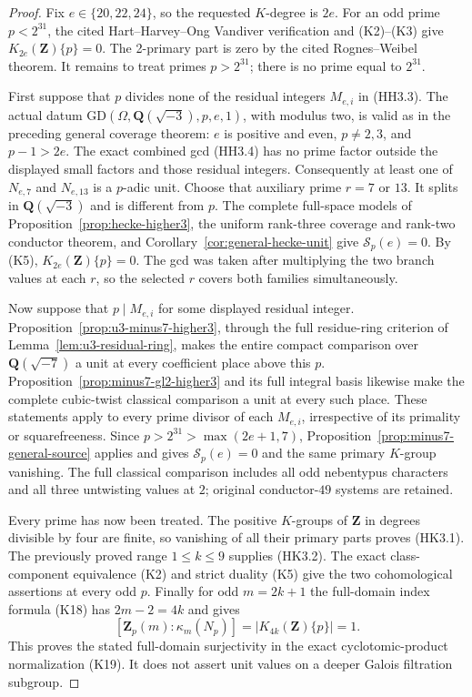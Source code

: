 \begin{proof}
Fix $e\in\{20,22,24\}$, so the requested $K$-degree is $2e$.
For an odd prime $p<2^{31}$, the cited Hart--Harvey--Ong
Vandiver verification and (K2)--(K3) give
$K_{2e}(\mathbf Z)\{p\}=0$. The 2-primary part is zero by
the cited Rognes--Weibel theorem. It remains to treat
primes $p>2^{31}$; there is no prime equal to $2^{31}$.

First suppose that $p$ divides none of the residual integers
$M_{e,i}$ in (HH3.3). The actual datum
$\mathrm{GD}(\Omega,\mathbf Q(\sqrt{-3}),p,e,1)$, with
modulus two, is valid as in the preceding general coverage
theorem: $e$ is positive and even, $p\ne2,3$, and $p-1>2e$.
The exact combined gcd (HH3.4) has no prime factor outside
the displayed small factors and those residual integers.
Consequently at least one of $N_{e,7}$ and $N_{e,13}$ is a
$p$-adic unit. Choose that auxiliary prime $r=7$ or $13$.
It splits in $\mathbf Q(\sqrt{-3})$ and is different from $p$.
The complete full-space models of
Proposition~\ref{prop:hecke-higher3}, the uniform rank-three
coverage and rank-two conductor theorem, and
Corollary~\ref{cor:general-hecke-unit} give
$\mathcal S_p(e)=0$. By (K5),
$K_{2e}(\mathbf Z)\{p\}=0$.
The gcd was taken after multiplying the two branch values
at each $r$, so the selected $r$ covers both families
simultaneously.

Now suppose that $p\mid M_{e,i}$ for some displayed residual
integer. Proposition~\ref{prop:u3-minus7-higher3}, through the
full residue-ring criterion of Lemma~\ref{lem:u3-residual-ring},
makes the entire compact comparison over
$\mathbf Q(\sqrt{-7})$ a unit at every coefficient place
above this $p$. Proposition~\ref{prop:minus7-gl2-higher3}
and its full integral basis likewise make the complete
cubic-twist classical comparison a unit at every such place.
These statements apply to every prime divisor of each
$M_{e,i}$, irrespective of its primality or squarefreeness.
Since $p>2^{31}>\max(2e+1,7)$,
Proposition~\ref{prop:minus7-general-source} applies and gives
$\mathcal S_p(e)=0$ and the same primary $K$-group vanishing.
The full classical comparison includes all odd nebentypus
characters and all three untwisting values at $2$; original
conductor-$49$ systems are retained.

Every prime has now been treated. The positive $K$-groups of
$\mathbf Z$ in degrees divisible by four are finite, so
vanishing of all their primary parts proves (HK3.1).
The previously proved range $1\leq k\leq9$ supplies (HK3.2).
The exact class-component equivalence (K2) and strict duality
(K5) give the two cohomological assertions at every odd $p$.
Finally for odd $m=2k+1$ the full-domain index formula (K18)
has $2m-2=4k$ and gives
\[
 [\mathbf Z_p(m):\kappa_m(N_p)]
          =|K_{4k}(\mathbf Z)\{p\}|=1.
\]
This proves the stated full-domain surjectivity in the exact
cyclotomic-product normalization (K19). It does not assert
unit values on a deeper Galois filtration subgroup.
\end{proof}

